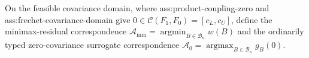 On the feasible covariance domain, where ass:product-coupling-zero and ass:frechet-covariance-domain give \(0\in\mathcal C(F_1,F_0)=[c_L,c_U]\), define the minimax-residual correspondence \(\mathcal A_{\mathrm{mm}}=\operatorname*{argmin}_{B\in\mathcal B_\kappa}w(B)\) and the ordinarily typed zero-covariance surrogate correspondence \(\mathcal A_0=\operatorname*{argmax}_{B\in\mathcal B_\kappa}g_B(0)\).